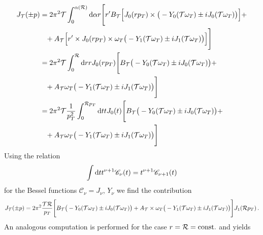 \begin{subequations}
    \begin{align}
        J_{\mathcal{T}}(\pm p)&=2\pi^2\mathcal{T}\int_0^{\alpha(\mathcal{R})}\text{d}\alpha r\Bigg[r^\prime B_{\mathcal{T}}\Big[J_0(r p_T)\times\big(-Y_0(\mathcal{T}\omega_T)\pm{i} J_0(\mathcal{T}\omega_T)\big)\Big]+\nonumber                                                                                             \\
        &\phantom{=}+ A_{\mathcal{T}}\Big[r^\prime\times J_0(r p_T)\times\omega_T\big(-Y_1(\mathcal{T}\omega_T)\pm{i} J_1(\mathcal{T}\omega_T)\big)\Big]\Bigg]\\\
        &=2\pi^2\mathcal{T}\int_0^\mathcal{R}\text{d} rrJ_0(r p_T)\Bigg[B_{\mathcal{T}}\big(-Y_0(\mathcal{T}\omega_T)\pm{i} J_0(\mathcal{T}\omega_T)\big)+\nonumber                                                                                             \\
        &\phantom{=}+ A_{\mathcal{T}}\omega_T\big(-Y_1(\mathcal{T}\omega_T)\pm{i} J_1(\mathcal{T}\omega_T)\big)\Bigg]\\
        &=2\pi^2\mathcal{T}\frac{1}{p_T^2}\int_0^{\mathcal{R}p_T}\text{d} ttJ_0(t)\Bigg[B_{\mathcal{T}}\big(-Y_0(\mathcal{T}\omega_T)\pm{i} J_0(\mathcal{T}\omega_T)\big)+\nonumber                                                                                             \\
        &\phantom{=}+ A_{\mathcal{T}}\omega_T\big(-Y_1(\mathcal{T}\omega_T)\pm{i} J_1(\mathcal{T}\omega_T)\big)\Bigg]
    \end{align}
\end{subequations}
Using the relation
\begin{equation}
    \int\text{d} tt^{\nu+1}\mathscr{C}_\nu(t)=t^{\nu+1}\mathscr{C}_{\nu+1}(t)
\end{equation}
for the Bessel functions ${\mathscr{C}_\nu=J_\nu,\,Y_\nu}$ we find the contribution
\begin{equation}
    J_{\mathcal{T}}(\pm p)=2\pi^2\frac{\mathcal{T}\mathcal{R}}{p_T}\Bigg[B_{\mathcal{T}}\big(-Y_0(\mathcal{T}\omega_T)\pm{i} J_0(\mathcal{T}\omega_T)\big)+A_{\mathcal{T}}\times\omega_T\big(-Y_1(\mathcal{T}\omega_T)\pm{i} J_1(\mathcal{T}\omega_T)\big)\Bigg]J_1(\mathcal{R}p_T)\,.
    \label{eq:AnalyticSpec_Tconst}
\end{equation}
An analogous computation is performed for the case ${r=\mathcal{R}={\text{const.}}}$ and yields
